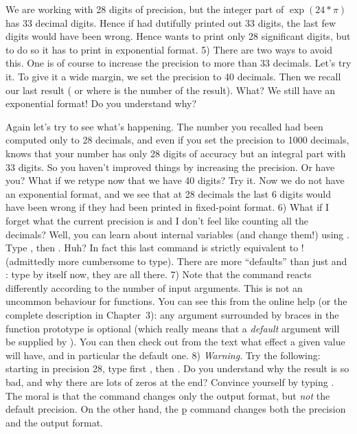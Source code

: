 We are working with 28 digits of precision, but the integer part of
$\exp(24*\pi)$ has 33 decimal digits. Hence if  had dutifully printed
out 33 digits, the last few digits would have been wrong. Hence 
wants to print only 28 significant digits, but to do so it has to print in
exponential format.
\smallskip
%
5) There are two ways to avoid this. One is of course to increase the
precision to more than 33 decimals. Let's try it. To give it a wide margin,
we set the precision to 40 decimals. Then we recall our last result (\kbd{\%}
or  where  is the number of the result). What? We still have
an exponential format! Do you understand why?

Again let's try to see what's happening. The number you recalled had been
computed only to 28 decimals, and even if you set the precision to 1000
decimals,  knows that your number has only 28 digits of accuracy but
an integral part with 33 digits. So you haven't improved things by increasing
the precision. Or have you? What if we retype  now that we
have 40 digits? Try it. Now we do not have an exponential format, and we see
that at 28 decimals the last 6 digits would have been wrong if they had been
printed in fixed-point format. \smallskip
\smallskip
%
6) What if I forget what the current precision is and I don't feel like
counting all the decimals? Well, you can learn about  internal
variables (and change them!) using . Type
, then . Huh? In
fact this last command is strictly equivalent to ! (admittedly
more cumbersome to type). There are more ``defaults'' than just 
and : type  by itself now, they are all
there.
\smallskip
%
7) Note that the  command reacts differently according to the
number of input arguments. This is not an uncommon behaviour for 
functions. You can see this from the online help (or the complete description
in Chapter~3): any argument surrounded by braces \kbd{\obr\cbr} in the
function prototype is optional (which really means that a \emph{default}
argument will be supplied by ). You can then check out from the text
what effect a given value will have, and in particular the default one.
\smallskip
%
8) \emph{Warning}. Try the following: starting in precision 28, type first
, then . Do you understand why
the result is so bad, and why there are lots of zeros at the end?  Convince
yourself by typing . The moral is that the
 command changes only the output format, but \emph{not}
the default precision. On the other hand, the \b{p} command changes both the
precision and the output format.


